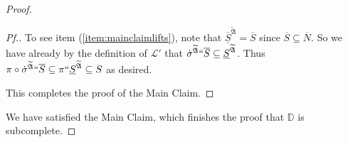 \documentclass{amsart}
\theoremstyle{definition}
\theoremstyle{remark}
\newcommand{\D}{\mathbb{D}}
\newcommand{\N}{{\overline{N}}}
\DeclareMathOperator{\ran}{range}
\newcommand{\SH}{\mathcal{H}\textit{ull} \,}
\newcommand{\sk}[3]{\SH^{#1}( {#2} \cup {\ran(#3)} ) }
\newcommand{\Sk}[3]{\SH^{#1}( {#2} \cup {#3} ) }
\begin{document}
\begin{proof}
\begin{proof}[Pf.]


To see item (\ref{item:mainclaimlifts}), note that $\overline{\underline S}^{\widetilde{\mathfrak A}} = \overline S$ since $\overline S \subseteq \overline N$. So we have already by the definition of $\mathcal L'$  that $\dot{\sigma}^{\widetilde{\mathfrak A}}``\overline S \subseteq \underline S^{\widetilde{\mathfrak A}}$. Thus $\pi \circ \dot{\sigma}^{\widetilde{\mathfrak A}}``\overline S \subseteq \pi `` \underline S^{\widetilde{\mathfrak A}} \subseteq S$ as desired. %

This completes the proof of the Main Claim.
\end{proof}
We have satisfied the Main Claim, which finishes the proof that $\D$ is subcomplete.
\end{proof}
\end{document}
